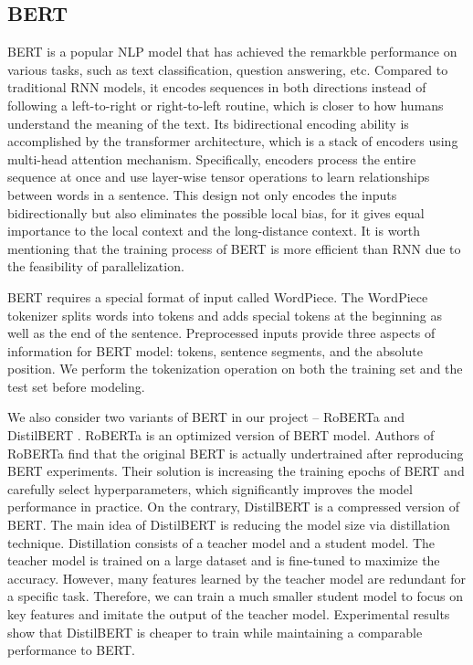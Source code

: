 \documentclass[runningheads]{llncs}
\begin{document}
\subsection{BERT}
BERT \cite{bert} is a popular NLP model that has achieved the remarkble performance on various tasks, such as text classification, question answering, etc. Compared to traditional RNN models, it encodes sequences in both directions instead of following a left-to-right or right-to-left routine, which is closer to how humans understand the meaning of the text. Its bidirectional encoding ability is accomplished by the transformer architecture, which is a stack of encoders using multi-head attention mechanism. Specifically, encoders process the entire sequence at once and use layer-wise tensor operations to learn relationships between words in a sentence. This design not only encodes the inputs bidirectionally but also eliminates the possible local bias, for it gives equal importance to the local context and the long-distance context. It is worth mentioning that the training process of BERT is more efficient than RNN due to the feasibility of parallelization.

BERT requires a special format of input called WordPiece. The WordPiece tokenizer splits words into tokens and adds special tokens at the beginning as well as the end of the sentence. Preprocessed inputs provide three aspects of information for BERT model: tokens, sentence segments, and the absolute position. We perform the tokenization operation on both the training set and the test set before modeling.

We also consider two variants of BERT in our project -- RoBERTa \cite{roberta} and DistilBERT \cite{distilbert}. RoBERTa is an optimized version of BERT model. Authors of RoBERTa find that the original BERT is actually undertrained after reproducing BERT experiments. Their solution is increasing the training epochs of BERT and carefully select hyperparameters, which significantly improves the model performance in practice. On the contrary, DistilBERT is a compressed version of BERT. The main idea of DistilBERT is reducing the model size via distillation technique. Distillation consists of a teacher model and a student model. The teacher model is trained on a large dataset and is fine-tuned to maximize the accuracy. However, many features learned by the teacher model are redundant for a specific task. Therefore, we can train a much smaller student model to focus on key features and imitate the output of the teacher model. Experimental results show that DistilBERT is cheaper to train while maintaining a comparable performance to BERT.
\end{document}
